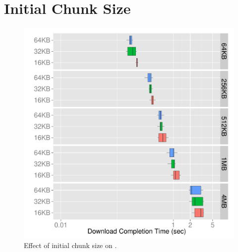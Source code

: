 \clearpage
\section{Initial Chunk Size}
\label{sec:evaluation-initial-chunk}

\begin{figure}[!htb]
	\begin{minipage}[t]{0.8\linewidth}
	\begin{center}
      	\includegraphics[width=\linewidth]{Figures/dynamic-alpha-initial-chunk.pdf}
		\caption{\label{fig:evaluation-initial-chunk-alpha} Effect of initial chunk size on \algalpha.}
    \end{center}
	\end{minipage}
\vspace*{-0.3cm}
\end{figure}
